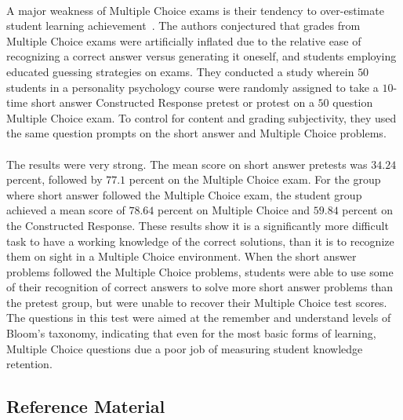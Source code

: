 \documentclass[12pt]{article}
\begin{document}
\paragraph{}
A major weakness of Multiple Choice exams is their tendency to over-estimate student learning achievement~\cite{funk2011multiple}. The authors conjectured that grades from Multiple Choice exams were artificially inflated due to the relative ease of recognizing a correct answer versus generating it oneself, and students employing educated guessing strategies on exams. They conducted a study wherein $50$ students in a personality psychology course were randomly assigned to take a $10$-time short answer Constructed Response pretest or protest on a $50$ question Multiple Choice exam. To control for content and grading subjectivity, they used the same question prompts on the short answer and Multiple Choice problems.
\paragraph{}
The results were very strong. The mean score on short answer pretests was $34.24$ percent, followed by $77.1$ percent on the Multiple Choice exam. For the group where short answer followed the Multiple Choice exam, the student group achieved a mean score of $78.64$ percent on Multiple Choice and $59.84$ percent on the Constructed Response. These results show it is a significantly more difficult task to have a working knowledge of the correct solutions, than it is to recognize them on sight in a Multiple Choice environment. When the short answer problems followed the Multiple Choice problems, students were able to use some of their recognition of correct answers to solve more short answer problems than the pretest group, but were unable to recover their Multiple Choice test scores. The questions in this test were aimed at the remember and understand levels of Bloom's taxonomy, indicating that even for the most basic forms of learning, Multiple Choice questions due a poor job of measuring student knowledge retention.
\subsection{Reference Material}
\end{document}
